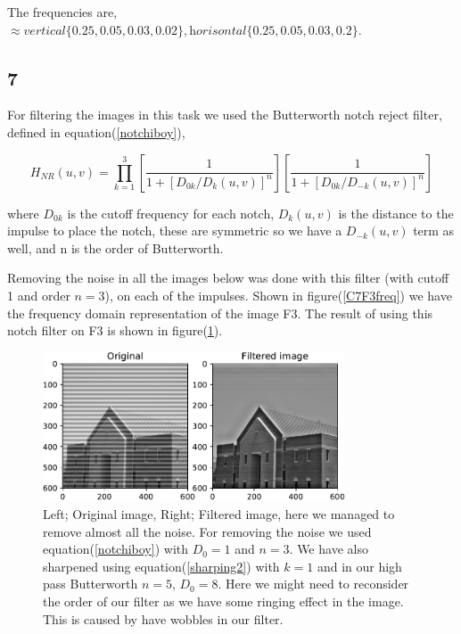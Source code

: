 {The frequencies are, $\approx \textit{vertical}\{0.25, 0.05, 0.03, 0.02\}, \textit{horisontal}\{0.25, 0.05, 0.03, 0.2\}$.





\subsection{7}


For filtering the images in this task we used the Butterworth notch reject filter, defined in equation(\ref{notchiboy}),

\begin{equation}
    H_{NR}(u,v) = \prod_{k=1}^{3}\left[\frac{1}{1+[D_{0k}/D_{k}(u,v)]^{n}} \right]\left[\frac{1}{1+[D_{0k}/D_{-k}(u,v)]^{n}} \right]
    \label{notchiboy}
\end{equation}

where $D_{0k}$ is the cutoff frequency for each notch, $D_{k}(u,v)$ is the distance to the impulse to place the notch, these are symmetric so we have a $D_{-k}(u,v)$ term as well, and n is the order of Butterworth.

Removing the noise in all the images below was done with this filter (with cutoff 1 and order $n = 3$), on each of the impulses. Shown in figure(\ref{C7F3freq}) we have the frequency domain representation of the image F3. The result of using this notch filter on F3 is shown in figure(\ref{C7F3}).

\begin{figure}[!htb]
    {\centering
        \includegraphics[width=0.80\textwidth]{C7F3.pdf}
        \caption{Left; Original image, Right; Filtered image, here we managed to remove almost all the noise. For removing the noise we used equation(\ref{notchiboy}) with $D_{0} = 1$ and $n = 3$.  We have also sharpened using equation(\ref{sharping2}) with $k = 1$ and in our high pass Butterworth $n = 5$, $D_{0} = 8$. Here we might need to reconsider the order of our filter as we have some ringing effect in the image. This is caused by have wobbles in our filter.}
        \label{C7F3}
    \par}
    \end{figure}



}
